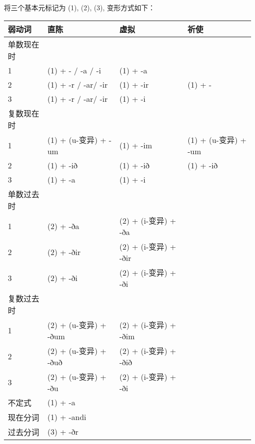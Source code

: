 将三个基本元标记为 (1), (2), (3), 变形方式如下：

\begin{longtable}{llll}
    \toprule
    弱动词     & 直陈                  & 虚拟                  & 祈使                 \\
    \midrule
    \endhead
    \bottomrule
    \endfoot
    单数现在时 &                       &                       &                      \\
    1          & (1) + - / -a / -i     & (1) + -a              &                      \\
    2          & (1) + -r / -ar/ -ir   & (1) + -ir             & (1) + -              \\
    3          & (1) + -r / -ar/ -ir   & (1) + -i              &                      \\
    复数现在时 &                       &                       &                      \\
    1          & (1) + (u-变异) + -um  & (1) + -im             & (1) + (u-变异) + -um \\
    2          & (1) + -ið             & (1) + -ið             & (1) + -ið            \\
    3          & (1) + -a              & (1) + -i              &                      \\
    单数过去时 &                       &                       &                      \\
    1          & (2) + -ða             & (2) + (i-变异) + -ða  &                      \\
    2          & (2) + -ðir            & (2) + (i-变异) + -ðir &                      \\
    3          & (2) + -ði             & (2) + (i-变异) + -ði  &                      \\
    复数过去时 &                       &                       &                      \\
    1          & (2) + (u-变异) + -ðum & (2) + (i-变异) + -ðim &                      \\
    2          & (2) + (u-变异) + -ðuð & (2) + (i-变异) + -ðið &                      \\
    3          & (2) + (u-变异) + -ðu  & (2) + (i-变异) + -ði  &                      \\
    不定式     & (1) + -a              &                       &                      \\
    现在分词   & (1) + -andi           &                       &                      \\
    过去分词   & (3) + -ðr             &                       &                      \\
\end{longtable}

